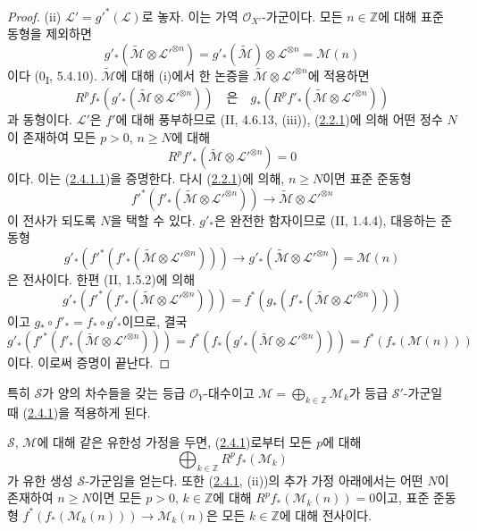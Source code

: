 \begin{proof}
(ii) $\mathcal L'=g'^*(\mathcal L)$로 놓자. 이는 가역
$\mathcal O_{X'}$-가군이다. 모든 $n\in\mathbb Z$에 대해 표준 동형을
제외하면
\[
g'_*(\widetilde{\mathcal M}\otimes\mathcal L'^{\otimes n})
=g'_*(\widetilde{\mathcal M})\otimes\mathcal L^{\otimes n}
=\mathcal M(n)
\]
이다 (0\textsubscript{I}, 5.4.10). $\widetilde{\mathcal M}$에 대해
(i)에서 한 논증을
$\widetilde{\mathcal M}\otimes\mathcal L'^{\otimes n}$에 적용하면
\[
R^pf_*(g'_*(\widetilde{\mathcal M}\otimes\mathcal L'^{\otimes n}))
\quad\text{은}\quad
g_*(R^pf'_*(\widetilde{\mathcal M}\otimes\mathcal L'^{\otimes n}))
\]
과 동형이다. $\mathcal L'$은 $f'$에 대해 풍부하므로
(II, 4.6.13, (iii)), (\hyperref[III.2.2.1-fr]{2.2.1})에 의해 어떤
정수 $N$이 존재하여 모든 $p>0$, $n\geq N$에 대해
\[
R^pf'_*(\widetilde{\mathcal M}\otimes\mathcal L'^{\otimes n})=0
\]
이다. 이는 (\hyperref[III.2.4.1.1-fr]{2.4.1.1})을 증명한다.
다시 (\hyperref[III.2.2.1-fr]{2.2.1})에 의해, $n\geq N$이면 표준
준동형
\[
f'^*(f'_*(\widetilde{\mathcal M}\otimes\mathcal L'^{\otimes n}))
\longrightarrow\widetilde{\mathcal M}\otimes\mathcal L'^{\otimes n}
\]
이 전사가 되도록 $N$을 택할 수 있다. $g'_*$은 완전한 함자이므로
(II, 1.4.4), 대응하는 준동형
\[
g'_*(f'^*(f'_*(\widetilde{\mathcal M}\otimes
\mathcal L'^{\otimes n})))
\longrightarrow
g'_*(\widetilde{\mathcal M}\otimes\mathcal L'^{\otimes n})
=\mathcal M(n)
\]
은 전사이다. 한편 (II, 1.5.2)에 의해
\[
g'_*(f'^*(f'_*(\widetilde{\mathcal M}\otimes
\mathcal L'^{\otimes n})))
=f^*(g_*(f'_*(\widetilde{\mathcal M}\otimes
\mathcal L'^{\otimes n})))
\]
이고 $g_*\circ f'_* = f_*\circ g'_*$이므로, 결국
\[
g'_*(f'^*(f'_*(\widetilde{\mathcal M}\otimes\mathcal L'^{\otimes n})))
=f^*(f_*(g'_*(\widetilde{\mathcal M}\otimes
\mathcal L'^{\otimes n})))=f^*(f_*(\mathcal M(n)))
\]
이다. 이로써 증명이 끝난다.
\end{proof}

\begin{env}[2.4.2]
\label{III.2.4.2-fr}
특히 $\mathcal S$가 양의 차수들을 갖는 등급 $\mathcal O_Y$-대수이고
$\mathcal M=\bigoplus_{k\in\mathbb Z}\mathcal M_k$가 등급
$\mathcal S'$-가군일 때 (\hyperref[III.2.4.1-fr]{2.4.1})을 적용하게
된다.

$\mathcal S$, $\mathcal M$에 대해 같은 유한성 가정을 두면,
(\hyperref[III.2.4.1-fr]{2.4.1})로부터 모든 $p$에 대해
\[
\bigoplus_{k\in\mathbb Z}R^pf_*(\mathcal M_k)
\]
가 유한 생성 $\mathcal S$-가군임을 얻는다. 또한
(\hyperref[III.2.4.1-fr]{2.4.1}, (ii))의 추가 가정 아래에서는 어떤
$N$이 존재하여 $n\geq N$이면 모든 $p>0$, $k\in\mathbb Z$에 대해
$R^pf_*(\mathcal M_k(n))=0$이고, 표준 준동형
$f^*(f_*(\mathcal M_k(n)))\to\mathcal M_k(n)$은 모든
$k\in\mathbb Z$에 대해 전사이다.
\end{env}

